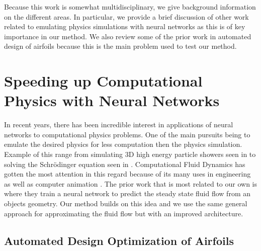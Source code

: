 \documentclass{article} %
\begin{document}
Because this work is somewhat multidisciplinary, we give background information on the different areas. In particular, we provide a brief discussion of other work related to emulating physics simulations with neural networks as this is of key importance in our method. We also review some of the prior work in automated design of airfoils because this is the main problem used to test our method.

\section{Speeding up Computational Physics with Neural Networks}

In recent years, there has been incredible interest in applications of neural networks to computational physics problems. One of the main pursuits being to emulate the desired physics for less computation then the physics simulation. Example of this range from simulating 3D high energy particle showers seen in \citep{2017arXiv170502355P} to solving the Schrödinger equation seen in \citep{mills2017deep}. Computational Fluid Dynamics has gotten the most attention in this regard because of its many uses in engineering as well as computer animation \cite{tompson2016accelerating} \cite{2017arXiv170509036H}. The prior work that is most related to our own is \citep{guo2016convolutional} where they train a neural network to predict the steady state fluid flow from an objects geometry. Our method builds on this idea and we use the same general approach for approximating the fluid flow but with an improved architecture.

\subsection{Automated Design Optimization of Airfoils}
\end{document}
